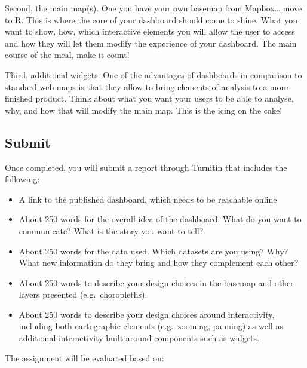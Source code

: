 \documentclass[
  letterpaper,
  DIV=11,
  numbers=noendperiod]{scrreprt}
\providecommand{\tightlist}{%
  \setlength{\itemsep}{0pt}\setlength{\parskip}{0pt}}\usepackage{longtable,booktabs,array}
\begin{document}
Second, the main map(s). One you have your own basemap from
Mapbox\ldots{} move to R. This is where the core of your dashboard
should come to shine. What you want to show, how, which interactive
elements you will allow the user to access and how they will let them
modify the experience of your dashboard. The main course of the meal,
make it count!

Third, additional widgets. One of the advantages of dashboards in
comparison to standard web maps is that they allow to bring elements of
analysis to a more finished product. Think about what you want your
users to be able to analyse, why, and how that will modify the main map.
This is the icing on the cake!

\hypertarget{submit-1}{%
\subsection*{Submit}\label{submit-1}}

Once completed, you will submit a report through Turnitin that includes
the following:

\begin{itemize}
\tightlist
\item
  A link to the published dashboard, which needs to be reachable online
\item
  About 250 words for the overall idea of the dashboard. What do you
  want to communicate? What is the story you want to tell?
\item
  About 250 words for the data used. Which datasets are you using? Why?
  What new information do they bring and how they complement each other?
\item
  About 250 words to describe your design choices in the basemap and
  other layers presented (e.g.~choropleths).
\item
  About 250 words to describe your design choices around interactivity,
  including both cartographic elements (e.g.~zooming, panning) as well
  as additional interactivity built around components such as widgets.
\end{itemize}

The assignment will be evaluated based on:
\end{document}
